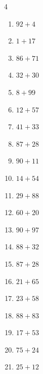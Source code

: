 \begin{multicols}{4}
\begin{enumerate}
  \item $92+4$
        \phantom{$=96$}

  \item $1+17$
        \phantom{$=18$}

  \item $86+71$
        \phantom{$=157$}

  \item $32+30$
        \phantom{$=62$}

  \item $8+99$
        \phantom{$=107$}

  \item $12+57$
        \phantom{$=69$}

  \item $41+33$
        \phantom{$=74$}

  \item $87+28$
        \phantom{$=115$}

  \item $90+11$
        \phantom{$=101$}

  \item $14+54$
        \phantom{$=68$}

  \item $29+88$
        \phantom{$=117$}

  \item $60+20$
        \phantom{$=80$}

  \item $90+97$
        \phantom{$=187$}

  \item $88+32$
        \phantom{$=120$}

  \item $87+28$
        \phantom{$=115$}

  \item $21+65$
        \phantom{$=86$}

  \item $23+58$
        \phantom{$=81$}

\columnbreak %

  \item $88+83$
        \phantom{$=171$}

  \item $17+53$
        \phantom{$=70$}

  \item $75+24$
        \phantom{$=99$}

  \item $25+12$
        \phantom{$=37$}


\end{enumerate}
\end{multicols}
